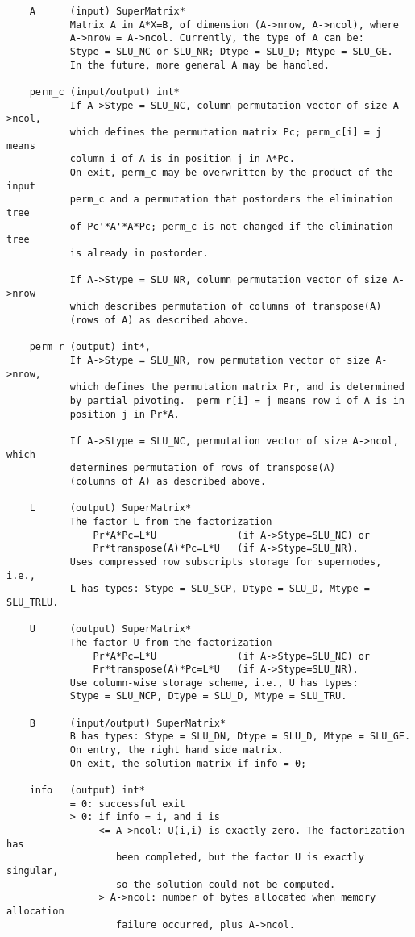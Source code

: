 \begin{verbatim}
    A      (input) SuperMatrix*
           Matrix A in A*X=B, of dimension (A->nrow, A->ncol), where
           A->nrow = A->ncol. Currently, the type of A can be:
           Stype = SLU_NC or SLU_NR; Dtype = SLU_D; Mtype = SLU_GE.
           In the future, more general A may be handled.

    perm_c (input/output) int*
           If A->Stype = SLU_NC, column permutation vector of size A->ncol,
           which defines the permutation matrix Pc; perm_c[i] = j means 
           column i of A is in position j in A*Pc.
           On exit, perm_c may be overwritten by the product of the input
           perm_c and a permutation that postorders the elimination tree
           of Pc'*A'*A*Pc; perm_c is not changed if the elimination tree
           is already in postorder.

           If A->Stype = SLU_NR, column permutation vector of size A->nrow
           which describes permutation of columns of transpose(A) 
           (rows of A) as described above.

    perm_r (output) int*,
           If A->Stype = SLU_NR, row permutation vector of size A->nrow, 
           which defines the permutation matrix Pr, and is determined 
           by partial pivoting.  perm_r[i] = j means row i of A is in 
           position j in Pr*A.

           If A->Stype = SLU_NC, permutation vector of size A->ncol, which
           determines permutation of rows of transpose(A)
           (columns of A) as described above.

    L      (output) SuperMatrix*
           The factor L from the factorization 
               Pr*A*Pc=L*U              (if A->Stype=SLU_NC) or
               Pr*transpose(A)*Pc=L*U   (if A->Stype=SLU_NR).
           Uses compressed row subscripts storage for supernodes, i.e.,
           L has types: Stype = SLU_SCP, Dtype = SLU_D, Mtype = SLU_TRLU.

    U      (output) SuperMatrix*
           The factor U from the factorization
               Pr*A*Pc=L*U              (if A->Stype=SLU_NC) or
               Pr*transpose(A)*Pc=L*U   (if A->Stype=SLU_NR).
           Use column-wise storage scheme, i.e., U has types:
           Stype = SLU_NCP, Dtype = SLU_D, Mtype = SLU_TRU.

    B      (input/output) SuperMatrix*
           B has types: Stype = SLU_DN, Dtype = SLU_D, Mtype = SLU_GE.
           On entry, the right hand side matrix.
           On exit, the solution matrix if info = 0;

    info   (output) int*
           = 0: successful exit
           > 0: if info = i, and i is
                <= A->ncol: U(i,i) is exactly zero. The factorization has
                   been completed, but the factor U is exactly singular,
                   so the solution could not be computed.
                > A->ncol: number of bytes allocated when memory allocation
                   failure occurred, plus A->ncol.
\end{verbatim}


